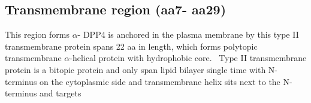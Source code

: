 \subsection{Transmembrane region (aa7- aa29)}

This region forms $\alpha$-
DPP4 is anchored in the plasma membrane by this type II transmembrane protein spans 22 aa in length, which forms polytopic transmembrane $\alpha$-helical protein with hydrophobic core.~\cite{Hong_1990} Type II transmembrane protein is a bitopic protein and only span lipid bilayer single time with N-terminus on the cytoplasmic side and transmembrane helix sits next to the N-terminus and targets 


